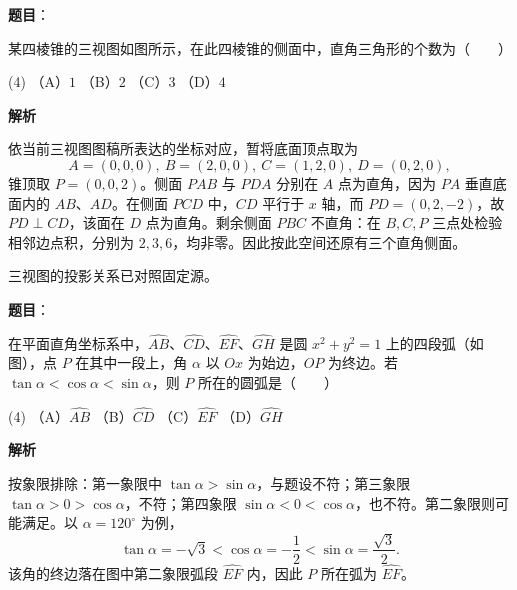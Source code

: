 \begin{answer}

\textbf{题目}：

某四棱锥的三视图如图所示，在此四棱锥的侧面中，直角三角形的个数为\mbox{（　　）}
\nopagebreak[4]
\begin{center}\end{center}
\nopagebreak[4]
\begin{gkopts}(4)
\task （A）$1$
\task （B）$2$
\task （C）$3$
\task （D）$4$
\end{gkopts}

\textbf{解析}

依当前三视图图稿所表达的坐标对应，暂将底面顶点取为
\nopagebreak[4]
\[
A=(0,0,0),\ B=(2,0,0),\ C=(1,2,0),\ D=(0,2,0),
\]
锥顶取 $P=(0,0,2)$。侧面 $PAB$ 与 $PDA$ 分别在 $A$ 点为直角，因为 $PA$ 垂直底面内的 $AB$、$AD$。在侧面 $PCD$ 中，$CD$ 平行于 $x$ 轴，而 $PD=(0,2,-2)$，故 $PD\perp CD$，该面在 $D$ 点为直角。剩余侧面 $PBC$ 不直角：在 $B,C,P$ 三点处检验相邻边点积，分别为 $2,3,6$，均非零。因此按此空间还原有三个直角侧面。

三视图的投影关系已对照固定源。


\end{answer}
\begin{answer}

\textbf{题目}：

在平面直角坐标系中，$\widehat{AB}$、$\widehat{CD}$、$\widehat{EF}$、$\widehat{GH}$ 是圆 $x^2+y^2=1$ 上的四段弧（如图），点 $P$ 在其中一段上，角 $\alpha$ 以 $Ox$ 为始边，$OP$ 为终边。若 $\tan\alpha<\cos\alpha<\sin\alpha$，则 $P$ 所在的圆弧是\mbox{（　　）}
\nopagebreak[4]
\begin{center}\end{center}
\nopagebreak[4]
\begin{gkopts}(4)
\task （A）$\widehat{AB}$
\task （B）$\widehat{CD}$
\task （C）$\widehat{EF}$
\task （D）$\widehat{GH}$
\end{gkopts}

\textbf{解析}

按象限排除：第一象限中 $\tan\alpha>\sin\alpha$，与题设不符；第三象限 $\tan\alpha>0>\cos\alpha$，不符；第四象限 $\sin\alpha<0<\cos\alpha$，也不符。第二象限则可能满足。以 $\alpha=120^\circ$ 为例，
\nopagebreak[4]
\[
\tan\alpha=-\sqrt3<\cos\alpha=-\frac12<\sin\alpha=\frac{\sqrt3}{2}.
\]
该角的终边落在图中第二象限弧段 $\widehat{EF}$ 内，因此 $P$ 所在弧为 $\widehat{EF}$。


\end{answer}
